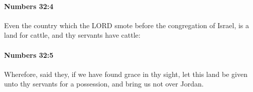 		\paragraph{Numbers 32:4} %
			\label{NUMBERS-32-4}

			Even the country which the LORD smote before the congregation of Israel, is a land for cattle, and thy servants have cattle:


		\paragraph{Numbers 32:5} %
			\label{NUMBERS-32-5}

			Wherefore, said they, if we have found grace in thy sight, let this land be given unto thy servants for a possession, and bring us not over Jordan.



